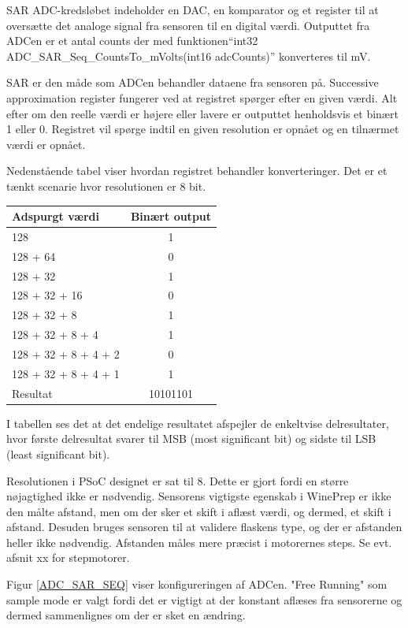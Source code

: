 SAR ADC-kredsløbet indeholder en DAC, en komparator og et register til at oversætte det analoge signal fra sensoren til en digital værdi. Outputtet fra ADCen er et antal counts der med funktionen\linebreak ``int32 ADC\_SAR\_Seq\_CountsTo\_mVolts(int16 adcCounts)'' konverteres til mV.

SAR er den måde som ADCen behandler dataene fra sensoren på. Successive approximation register fungerer ved at registret spørger efter en given værdi. Alt efter om den reelle værdi er højere eller lavere er outputtet henholdsvis et binært 1 eller 0. Registret vil spørge indtil en given resolution er opnået og en tilnærmet værdi er opnået.

Nedenstående tabel viser hvordan registret behandler konverteringer. Det er et tænkt scenarie hvor resolutionen er 8 bit.

\begin{table}
\begin{tabular}{| l | c |}
\hline
Adspurgt værdi & Binært output\\\hline
128 & 1\\\hline
128 + 64 & 0\\\hline
128 + 32 & 1\\\hline
128 + 32 + 16 & 0\\\hline
128 + 32 + 8 & 1\\\hline
128 + 32 + 8 + 4 & 1\\\hline
128 + 32 + 8 + 4 + 2 & 0\\\hline
128 + 32 + 8 + 4 + 1 & 1\\\hline
Resultat & 10101101\\\hline
\end{tabular}
\end{table}

I tabellen ses det at det endelige resultatet afspejler de enkeltvise delresultater, hvor første delresultat svarer til MSB (most significant bit) og sidste til LSB (least significant bit).

Resolutionen i PSoC designet er sat til 8. Dette er gjort fordi en større nøjagtighed ikke er nødvendig. Sensorens vigtigste egenskab i WinePrep er ikke den målte afstand, men om der sker et skift i aflæst værdi, og dermed, et skift i afstand. Desuden bruges sensoren til at validere flaskens type, og der er afstanden heller ikke nødvendig. Afstanden måles mere præcist i motorernes steps. Se evt. afsnit xx for stepmotorer.

Figur \ref{ADC_SAR_SEQ} viser konfigureringen af ADCen. "Free Running" som sample mode er valgt fordi det er vigtigt at der konstant aflæses fra sensorerne og dermed sammenlignes om der er sket en ændring.

